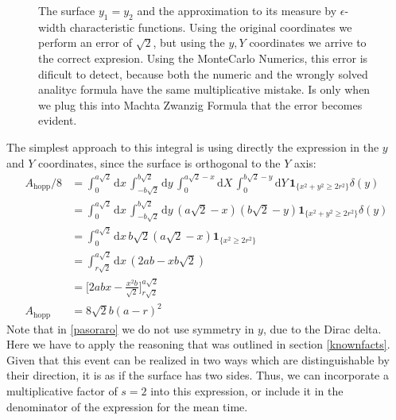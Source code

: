 \documentclass[superscriptaddress,pre,reprint,showpacs,onecolumn]{revtex4-1}
\newcommand{\rd}[1]{\mathrm{d}{#1} \,}
\newcommand{\indicatorsymbol}{\mathbf{1}}
\newcommand{\indicator}[1]{\indicatorsymbol_{ \{   #1 \} } }
\begin{document}
\begin{figure}
\caption{The surface $y_1=y_2$ and the approximation to its measure by
  $\epsilon$-width characteristic functions. Using the original coordinates
  we perform an error of $\sqrt{2}$, but using the $y,Y$ coordinates
  we arrive to the correct expresion. Using the MonteCarlo Numerics, this
  error is dificult to detect, because both the numeric and the wrongly solved
  analityc formula have the same multiplicative mistake. Is only when we plug this into
Machta Zwanzig Formula that the error becomes evident. }\label{DiagramaDelta01}
\end{figure}

The simplest approach to this integral is using directly the expression in the $y$ and $Y$
coordinates, since the surface is orthogonal to the $Y$ axis:
  \begin{align}
    A_\text{hopp}/8 & = \int_0^{a\sqrt{2}} \rd x  \int_{-b\sqrt{2}}^{b \sqrt{2}} \rd y
    \int_0^{a\sqrt{2}-x} \rd X  \int_0^{b \sqrt{2}-y} \rd Y
    \indicator{x^2+y^2 \geq 2 r^2} \delta (y) \label{pasoraro} \\
    &=  \int_0^{a\sqrt{2}} \rd x  \int_{-b\sqrt{2}}^{b \sqrt{2}} \rd y
    (a\sqrt{2}-x)(b\sqrt{2}-y)
    \indicator{x^2+y^2 \geq 2 r^2} \delta (y)\\
    &= \int_0^{a\sqrt{2}} \rd x b\sqrt{2} (a\sqrt{2}-x)
    \indicator{x^2\geq 2 r^2} \\
    &= \int_{r\sqrt{2}}^{a\sqrt{2}} \rd x
    (2ab-xb\sqrt{2})\\
    &=\biggl[2abx-\frac{x^2b}{\sqrt{2}} \biggr]_{r\sqrt{2}}^{a\sqrt{2}}\\
      A_\text{hopp}&=8\sqrt{2}b(a-r)^2
  \end{align}
  Note that in \eqref{pasoraro} we do not use symmetry in
  $y$, due to the Dirac delta.
  Here we have to apply the reasoning that was outlined in section \ref{knownfacts}.
  Given that this event can be realized in two ways which are
  distinguishable by their direction, it is as if the surface has two sides.
  Thus, we can incorporate a multiplicative factor of $s=2$ into this expression, or include it in the denominator of 
  the expression for the mean time.
\end{document}

